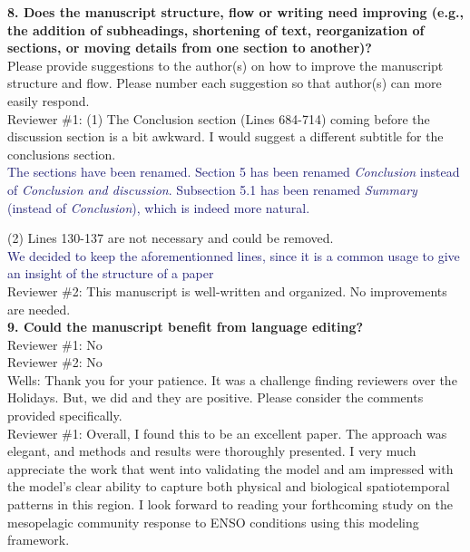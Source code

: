 \documentclass[12pt]{article}
\newcommand{\resp}[1]{\textcolor{MidnightBlue}{#1}}
\begin{document}
\textbf{8. Does the manuscript structure, flow or writing need improving (e.g., the addition of subheadings, shortening of text, reorganization of sections, or moving details from one section to another)?}\\

Please provide suggestions to the author(s) on how to improve the manuscript structure and flow. Please number each suggestion so that author(s) can more easily respond.\\

Reviewer \#1: (1) The Conclusion section (Lines 684-714) coming before the discussion section is a bit awkward. I would suggest a different subtitle for the conclusions section.\\

\resp{The sections have been renamed. Section 5 has been renamed \emph{Conclusion} instead of \emph{Conclusion and discussion}. Subsection 5.1 has been renamed \emph{Summary} (instead of \emph{Conclusion}), which is indeed more natural.}

(2) Lines 130-137 are not necessary and could be removed.\\

\resp{We decided to keep the aforementionned lines, since it is a common usage to give an insight of the structure of a paper} \\

Reviewer \#2: This manuscript is well-written and organized. No improvements are needed.\\

\textbf{9. Could the manuscript benefit from language editing?}\\

Reviewer \#1: No\\

Reviewer \#2: No\\

Wells: Thank you for your patience. It was a challenge finding reviewers over the Holidays. But, we did and they are positive. Please consider the comments provided specifically.\\

Reviewer \#1: Overall, I found this to be an excellent paper. The approach was elegant, and methods and results were thoroughly presented. I very much appreciate the work that went into validating the model and am impressed with the model's clear ability to capture both physical and biological spatiotemporal patterns in this region. I look forward to reading your forthcoming study on the mesopelagic community response to ENSO conditions using this modeling framework.\\
\end{document}
